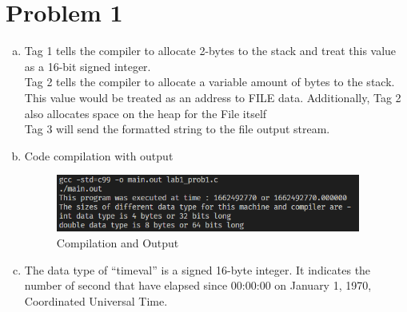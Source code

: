 \clearpage
\section*{Problem 1}
\begin{enumerate}[a)]
    \item Tag 1 tells the compiler to allocate 2-bytes to the stack and treat this value as a 16-bit signed integer.\\
    Tag 2 tells the compiler to allocate a variable amount of bytes to the stack. This value would be treated as an address to FILE data. Additionally, Tag 2 also allocates space on the heap for the File itself\\
    Tag 3 will send the formatted string to the file output stream.
    \item Code compilation with output
    \begin{figure}[h]
        \centering
        \includegraphics[width=10cm]{Images/1b.png}
        \caption{Compilation and Output}
    \end{figure}
    
    \item The data type of ``timeval'' is a signed 16-byte integer. It indicates the number of second that have elapsed since 00:00:00 on January 1, 1970, Coordinated Universal Time.
\end{enumerate}